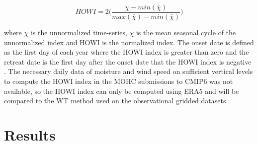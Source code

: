  \begin{equation}
 HOWI = 2 \bigg(\frac{\chi - min(\bar{\chi})}{max(\bar{\chi})-min(\bar{\chi})} \bigg)
 \end{equation}

 \noindent where $\chi$ is the unnormalized time-series, $\bar{\chi}$ is the mean seasonal cycle of the unnormalized index and HOWI is the normalized index. The onset date is defined as the first day of each year where the HOWI index is greater than zero and the retreat date is the first day after the onset date that the HOWI index is negative \citep{fasullo2003,Sahana_2015}.
 The necessary daily data of moisture and wind speed on sufficient vertical levels to compute the HOWI index in the MOHC submissions to CMIP6 was not available, so the HOWI index can only be computed using ERA5 and will be compared to the WT method used on the observational gridded datasets.

\section{Results}


